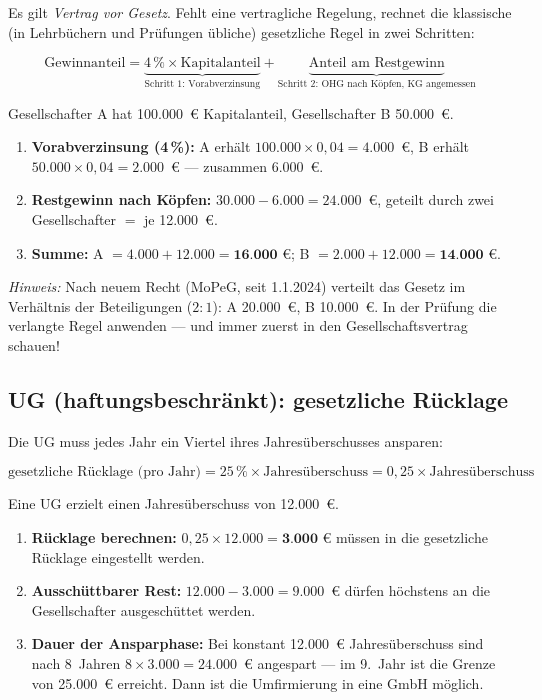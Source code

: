 \documentclass[11pt, a4paper]{article}
\begin{document}
Es gilt \emph{Vertrag vor Gesetz}. Fehlt eine vertragliche Regelung, rechnet die
klassische (in Lehrbüchern und Prüfungen übliche) gesetzliche Regel in zwei Schritten:

\[
\textrm{Gewinnanteil} = \underbrace{4\,\% \times \textrm{Kapitalanteil}}_{\textrm{Schritt 1: Vorabverzinsung}}
+ \underbrace{\textrm{Anteil am Restgewinn}}_{\textrm{Schritt 2: OHG nach Köpfen, KG angemessen}}
\]

\begin{beispiel}[title={\bfseries Zahlenbeispiel: OHG mit 30.000~€ Gewinn}]
Gesellschafter A hat 100.000~€ Kapitalanteil, Gesellschafter B 50.000~€.
\begin{enumerate}
  \item \textbf{Vorabverzinsung (4\,\%):} A erhält $100.000 \times 0{,}04 = 4.000$~€,
    B erhält $50.000 \times 0{,}04 = 2.000$~€ --- zusammen 6.000~€.
  \item \textbf{Restgewinn nach Köpfen:} $30.000 - 6.000 = 24.000$~€, geteilt durch
    zwei Gesellschafter $=$ je 12.000~€.
  \item \textbf{Summe:} A $= 4.000 + 12.000 = \textbf{16.000~€}$;
    B $= 2.000 + 12.000 = \textbf{14.000~€}$.
\end{enumerate}
\emph{Hinweis:} Nach neuem Recht (MoPeG, seit 1.1.2024) verteilt das Gesetz im
Verhältnis der Beteiligungen ($2:1$): A 20.000~€, B 10.000~€. In der Prüfung die
verlangte Regel anwenden --- und immer zuerst in den Gesellschaftsvertrag schauen!
\end{beispiel}

\subsection{UG (haftungsbeschränkt): gesetzliche Rücklage}

Die UG muss jedes Jahr ein Viertel ihres Jahresüberschusses ansparen:

\[
\textrm{gesetzliche Rücklage (pro Jahr)} = 25\,\% \times \textrm{Jahresüberschuss}
= 0{,}25 \times \textrm{Jahresüberschuss}
\]

\begin{beispiel}[title={\bfseries Zahlenbeispiel: UG-Rücklage}]
Eine UG erzielt einen Jahresüberschuss von 12.000~€.
\begin{enumerate}
  \item \textbf{Rücklage berechnen:} $0{,}25 \times 12.000 = \textbf{3.000~€}$
    müssen in die gesetzliche Rücklage eingestellt werden.
  \item \textbf{Ausschüttbarer Rest:} $12.000 - 3.000 = 9.000$~€ dürfen höchstens
    an die Gesellschafter ausgeschüttet werden.
  \item \textbf{Dauer der Ansparphase:} Bei konstant 12.000~€ Jahresüberschuss sind
    nach 8~Jahren $8 \times 3.000 = 24.000$~€ angespart --- im 9.~Jahr ist die Grenze
    von 25.000~€ erreicht. Dann ist die Umfirmierung in eine GmbH möglich.
\end{enumerate}
\end{beispiel}
\end{document}
